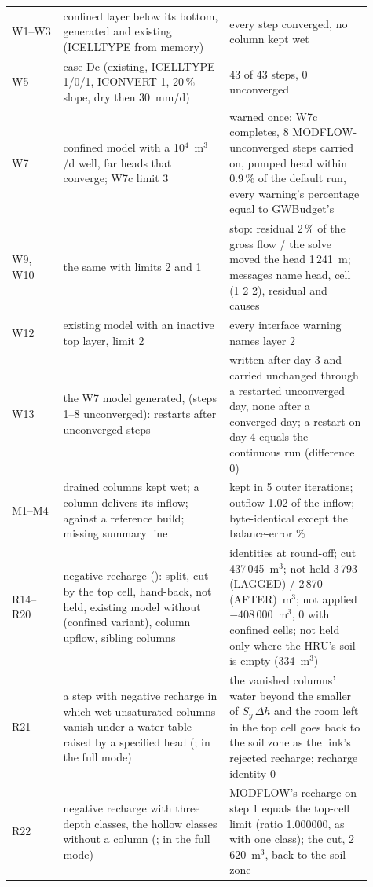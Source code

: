 \begin{longtable}{P{0.13\linewidth}P{0.42\linewidth}P{0.36\linewidth}}
W1--W3 & confined layer below its bottom, generated and existing (ICELLTYPE from memory) & every step converged, no column kept wet\\
W5 & case Dc (existing, ICELLTYPE 1/0/1, ICONVERT 1, 20\,\% slope, dry then 30~mm/d) & 43 of 43 steps, 0 unconverged\\
W7 & confined model with a 10$^4$~m$^3$/d well, far heads that converge; W7c limit 3 & warned once; W7c completes, 8 MODFLOW-unconverged steps carried on, pumped head within 0.9\,\% of the default run, every warning's percentage equal to GWBudget's\\
W9, W10 & the same with limits 2 and 1 & stop: residual 2\,\% of the gross flow / the solve moved the head 1\,241~m; messages name head, cell (1 2 2), residual and causes\\
W12 & existing model with an inactive top layer, limit 2 & every interface warning names layer 2\\
W13 & the W7 model generated,  (steps 1--8 unconverged): restarts after unconverged steps &  written after day 3 and carried unchanged through a restarted unconverged day, none after a converged day; a restart on day 4 equals the continuous run (difference 0)\\
M1--M4 & drained columns kept wet; a column delivers its inflow;  against a reference build; missing summary line & kept in 5 outer iterations; outflow 1.02 of the inflow; byte-identical except the balance-error \%\\
R14--R20 & negative recharge (): split, cut by the top cell, hand-back, not held, existing model without  (confined variant), column upflow, sibling columns & identities at round-off; cut 437\,045~m$^3$; not held 3\,793 (LAGGED) / 2\,870 (AFTER)~m$^3$; not applied $-408\,000$~m$^3$, 0 with confined cells; not held only where the HRU's soil is empty (334~m$^3$)\\
R21 & a step with negative recharge in which wet unsaturated columns vanish under a water table raised by a specified head (;  in the full mode) & the vanished columns' water beyond the smaller of $S_y\,\Delta h$ and the room left in the top cell goes back to the soil zone as the link's rejected recharge; recharge identity 0\\
R22 & negative recharge with three depth classes, the hollow classes without a column (;  in the full mode) & MODFLOW's recharge on step 1 equals the top-cell limit (ratio 1.000000, as with one class); the cut, 2\,620~m$^3$, back to the soil zone\\

\end{longtable}
